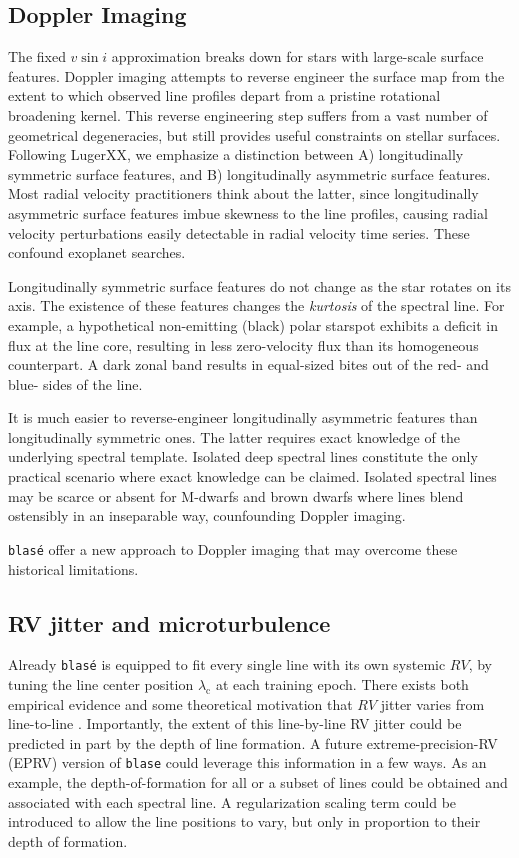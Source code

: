 \documentclass[modern]{aastex631}
\begin{document}
\subsection{Doppler Imaging}
The fixed $v\sin{i}$ approximation breaks down for stars with large-scale surface features.  Doppler imaging  attempts to reverse engineer the surface map from the extent to which observed line profiles depart from a pristine rotational broadening kernel.  This reverse engineering step suffers from a vast number of geometrical degeneracies, but still provides useful constraints on stellar surfaces.  Following LugerXX, we emphasize a distinction between A) longitudinally symmetric surface features, and B) longitudinally asymmetric surface features.  Most radial velocity practitioners think about the latter, since longitudinally asymmetric surface features imbue skewness to the line profiles, causing radial velocity perturbations easily detectable in radial velocity time series.  These confound exoplanet searches.

Longitudinally symmetric surface features do not change as the star rotates on its axis.  The existence of these features changes the \emph{kurtosis} of the spectral line.  For example, a hypothetical non-emitting (black) polar starspot exhibits a deficit in flux at the line core, resulting in less zero-velocity flux than its homogeneous counterpart.  A dark zonal band results in equal-sized bites out of the red- and blue- sides of the line.

It is much easier to reverse-engineer longitudinally asymmetric features than longitudinally symmetric ones.  The latter requires exact knowledge of the underlying spectral template.  Isolated deep spectral lines constitute the only practical scenario where exact knowledge can be claimed.  Isolated spectral lines may be scarce or absent for M-dwarfs and brown dwarfs where lines blend ostensibly in an inseparable way, counfounding Doppler imaging.

\texttt{blas\'e} offer a new approach to Doppler imaging that may overcome these historical limitations.


\subsection{RV jitter and microturbulence}

Already \texttt{blas\'e} is equipped to fit every single line with its own systemic $RV$, by tuning the line center position $\lambda_\mathrm{c}$ at each training epoch.  There exists both empirical evidence and some theoretical motivation that $RV$ jitter varies from line-to-line .  Importantly, the extent of this line-by-line RV jitter could be predicted in part by the depth of line formation.  A future extreme-precision-RV (EPRV) version of \texttt{blase} could leverage this information in a few ways.  As an example, the depth-of-formation for all or a subset of lines could be obtained and associated with each spectral line.  A regularization scaling term could be introduced to allow the line positions to vary, but only in proportion to their depth of formation.
\end{document}
